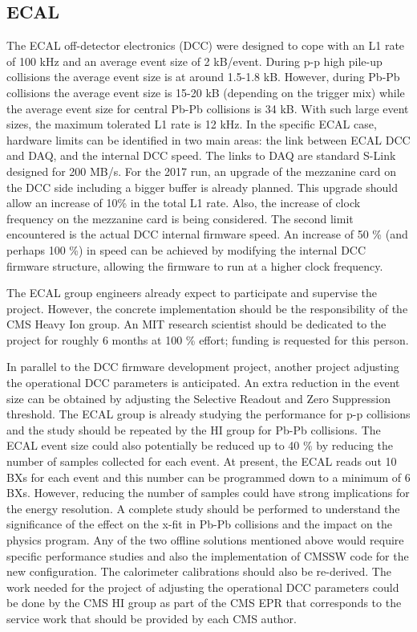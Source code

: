 \subsection{ECAL\label{subsec:ECAL}} 
The ECAL off-detector electronics (DCC) were designed to cope with an L1 rate of 100 kHz and an average event size of 2 kB/event. During p-p high pile-up collisions the average event size is at around 1.5-1.8 kB. However, during Pb-Pb collisions the average event size is 15-20 kB (depending on the trigger mix) while the average event size for central Pb-Pb collisions is 34 kB. With such large event sizes, the maximum tolerated L1 rate is 12 kHz. In the specific ECAL case, hardware limits can be identified in two main areas: the link between ECAL DCC and DAQ, and the internal DCC speed. The links to DAQ are standard S-Link designed for 200 MB/s. For the 2017 run, an upgrade of the mezzanine card on the DCC side including a bigger buffer is already planned. This upgrade should allow an increase of 10\% in the total L1 rate. Also, the increase of clock frequency on the mezzanine card is being considered. The second limit encountered is the actual DCC internal firmware speed. An increase of 50 \% (and perhaps 100 \%) in speed can be achieved by modifying the internal DCC firmware structure, allowing the firmware to run at a higher clock frequency. 

The ECAL group engineers already expect to participate and supervise the project. However, the concrete implementation should be the responsibility of the CMS Heavy Ion group. An MIT research scientist should be dedicated to the project for roughly 6 months at 100 \% effort; funding is requested for this person.

In parallel to the DCC firmware development project, another project adjusting the operational DCC parameters is anticipated. An extra reduction in the event size can be obtained by adjusting the Selective Readout and Zero Suppression threshold. The ECAL group is already studying the performance for p-p collisions and the study should be repeated by the HI group for Pb-Pb collisions. The ECAL event size could also potentially be reduced up to 40 \% by reducing the number of samples collected for each event. At present, the ECAL reads out 10 BXs for each event and this number can be programmed down to a minimum of 6 BXs. However, reducing the number of samples could have strong implications for the energy resolution. A complete study should be performed to understand the significance of the effect on the x-fit in Pb-Pb collisions and the impact on the physics program. Any of the two offline solutions mentioned above would require specific performance studies and also the implementation of CMSSW code for the new configuration. The calorimeter calibrations should also be re-derived. The work needed for the project of adjusting the operational DCC parameters could be done by the CMS HI group as part of the CMS EPR that corresponds to the service work that should be provided by each CMS author.  




